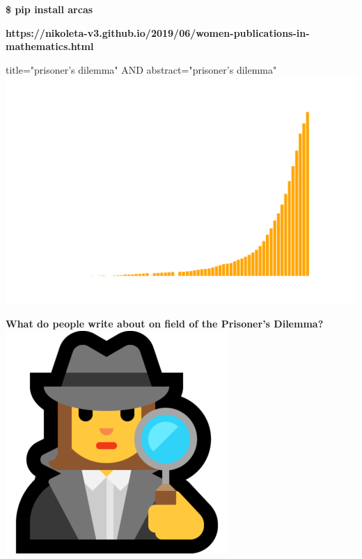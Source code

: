 \documentclass{beamer}
\begin{document}
\begin{frame}
    \begin{center}
        \Large{\textbf{\$ pip install arcas}}
    \end{center}
\end{frame}

\begin{frame}
    \begin{center}
        \textbf{https://nikoleta-v3.github.io/2019/06/women-publications-in-mathematics.html}
    \end{center}
\end{frame}

\begin{frame}
    \begin{center}
    \small{title="prisoner's dilemma" AND abstract="prisoner's dilemma"}\\
    
    \vspace{-.50cm}
    \includegraphics[width=\textwidth]{static/articles.png}
    \end{center}
\end{frame}

\begin{frame}
    \begin{center}
        \Large{\textbf{What do people write about on field of the Prisoner's Dilemma?}} \\ \vspace{1cm}
        \includegraphics[width=.15\textwidth]{static/detective.png} \\ \vspace{.5cm}
    \end{center}
\end{frame}
\end{document}
